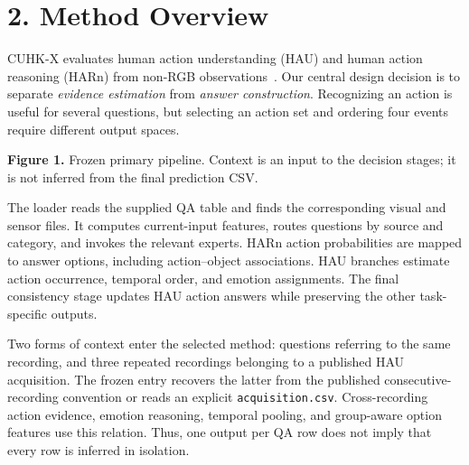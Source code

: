 \documentclass[12pt,a4paper]{article}
\newcommand{\file}[1]{\nolinkurl{#1}}
\newcommand{\pageheading}[1]{\vspace*{-5pt}\section*{#1}}
\begin{document}
\newpage
\pageheading{2. Method Overview}
CUHK-X evaluates human action understanding (HAU) and human action reasoning (HARn) from non-RGB observations~\cite{cuhkx}. Our central design decision is to separate \emph{evidence estimation} from \emph{answer construction}. Recognizing an action is useful for several questions, but selecting an action set and ordering four events require different output spaces.

\begin{center}
\end{center}
\textbf{Figure 1.} Frozen primary pipeline. Context is an input to the decision stages; it is not inferred from the final prediction CSV.

The loader reads the supplied QA table and finds the corresponding visual and sensor files. It computes current-input features, routes questions by source and category, and invokes the relevant experts. HARn action probabilities are mapped to answer options, including action--object associations. HAU branches estimate action occurrence, temporal order, and emotion assignments. The final consistency stage updates HAU action answers while preserving the other task-specific outputs.

Two forms of context enter the selected method: questions referring to the same recording, and three repeated recordings belonging to a published HAU acquisition. The frozen entry recovers the latter from the published consecutive-recording convention or reads an explicit \file{acquisition.csv}. Cross-recording action evidence, emotion reasoning, temporal pooling, and group-aware option features use this relation. Thus, one output per QA row does not imply that every row is inferred in isolation.
\end{document}
